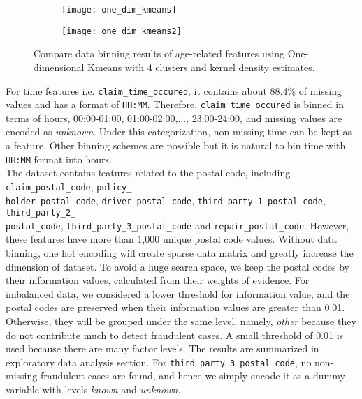 \documentclass[12pt]{article}
\begin{document}
\begin{figure}[h]
\centering
\begin{subfigure}{.5\textwidth}
  \centering
  \texttt{[image: one\_dim\_kmeans]}
  \label{fig:sub1}
\end{subfigure}%
\begin{subfigure}{.5\textwidth}
  \centering
  \texttt{[image: one\_dim\_kmeans2]}
  \label{fig:sub2}
\end{subfigure}
\vspace{-1cm}
\caption{Compare data binning results of age-related features using One-dimensional Kmeans with 4 clusters and kernel density estimates.}
\label{fig:feature_engineering_age_onedimkmeans}
\end{figure}

For time features i.e. \texttt{claim\_time\_occured}, it contains about 88.4\% of missing values and has a format of \texttt{HH:MM}. Therefore, \texttt{claim\_time\_occured} is binned in terms of hours, 00:00-01:00, 01:00-02:00,..., 23:00-24:00, and missing values are encoded as \textit{unknown}. Under this categorization, non-missing time can be kept as a feature. Other binning schemes are possible but it is natural to bin time with \texttt{HH:MM} format into hours.\\  

The dataset contains features related to the postal code, including \texttt{claim\_postal\_code}, \texttt{policy\_\\holder\_postal\_code}, \texttt{driver\_postal\_code}, \texttt{third\_party\_1\_postal\_code}, \texttt{third\_party\_2\_\\postal\_code}, \texttt{third\_party\_3\_postal\_code} and \texttt{repair\_postal\_code}. However, these features have more than 1,000 unique postal code values. Without data binning, one hot encoding will create sparse data matrix and greatly increase the dimension of dataset. To avoid a huge search space, we keep the postal codes by their information values, calculated from their weights of evidence. For imbalanced data, we considered a lower threshold for information value, and the postal codes are preserved when their information values are greater than 0.01. Otherwise, they will be grouped under the same level, namely, \textit{other} because they do not contribute much to detect fraudulent cases. A small threshold of 0.01 is used because there are many factor levels.  The results are summarized in exploratory data analysis section. For \texttt{third\_party\_3\_postal\_code}, no non-missing fraudulent cases are found, and hence we simply encode it as a dummy variable with levels \textit{known} and \textit{unknown}.
\end{document}
